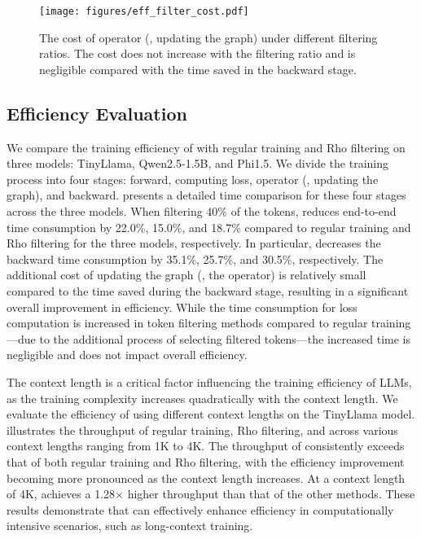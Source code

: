 \begin{figure}[t!]
	\centering
	\texttt{[image: figures/eff\_filter\_cost.pdf]}
	\caption{The cost of \solution operator (\ie, updating the graph) under different filtering ratios. The cost does not increase with the filtering ratio and is negligible compared with the time saved in the backward stage.}
	\label{fig:eff_filter_cost}
    \vspace{+1mm}
\end{figure}

\subsection{Efficiency Evaluation}

We compare the training efficiency of \solution with regular training and Rho filtering on three models: TinyLlama, Qwen2.5-1.5B, and Phi1.5. We divide the training process into four stages: forward, computing loss, \solution operator (\ie, updating the graph), and backward.  presents a detailed time comparison for these four stages across the three models.
When filtering 40\% of the tokens, \solution reduces end-to-end time consumption by 22.0\%, 15.0\%, and 18.7\% compared to regular training and Rho filtering for the three models, respectively. In particular, \solution decreases the backward time consumption by 35.1\%, 25.7\%, and 30.5\%, respectively. The additional cost of updating the graph (\ie, the \solution operator) is relatively small compared to the time saved during the backward stage, resulting in a significant overall improvement in efficiency.
While the time consumption for loss computation is increased in token filtering methods compared to regular training—due to the additional process of selecting filtered tokens—the increased time is negligible and does not impact overall efficiency.

The context length is a critical factor influencing the training efficiency of LLMs, as the training complexity increases quadratically with the context length. We evaluate the efficiency of \solution using different context lengths on the TinyLlama model.  illustrates the throughput of regular training, Rho filtering, and \solution across various context lengths ranging from 1K to 4K.
The throughput of \solution consistently exceeds that of both regular training and Rho filtering, with the efficiency improvement becoming more pronounced as the context length increases. At a context length of 4K, \solution achieves a 1.28$\times$ higher throughput than that of the other methods. These results demonstrate that \solution can effectively enhance efficiency in computationally intensive scenarios, such as long-context training.

